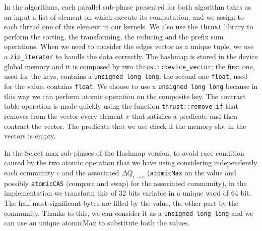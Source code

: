 In the algorithms, each parallel sub-phase presented for both algorithm takes as an input a list of element on which execute its computation, and we assign to each thread one of this element in our kernels. We also use the \verb|thrust| library to perform the sorting, the transforming, the reducing and the prefix sum operations. When we need to consider the edges vector as a unique tuple, we use a \verb|zip_iterator| to handle the data correctly.
The hashmap is stored in the device global memory and it is composed by two \verb|thrust::device_vector|: the first one, used for the keys, contains a \verb|unsigned long long|; the second one \verb|float|, used for the value, contains \verb|float|. We choose to use a \verb|unsigned long long| because in this way we can perform atomic operation on the composite key. The contract table operation is made quickly using the function \verb|thrust::remove_if| that removes from the vector every element $x$ that satisfies a predicate and then contract the vector. The predicate that we use check if the memory slot in the vectors is empty. 


In the Select max sub-phases of the Hashmap version, to avoid race condition caused by the two atomic operation that we have using considering independently each community $c$ and the associated $\Delta Q_{i\rightarrow c}$ (\verb|atomicMax| on the value and possibly \verb|atomicCAS| (compare and swap) for the associated community), in the implementation we transform this of 32 bits variable in a unique word of 64 bit. The half most significant bytes are filled by the value, the other part by the community. Thanks to this, we can consider it as a \verb|unsigned long long| and we can use an unique atomicMax to substitute both the values. 
